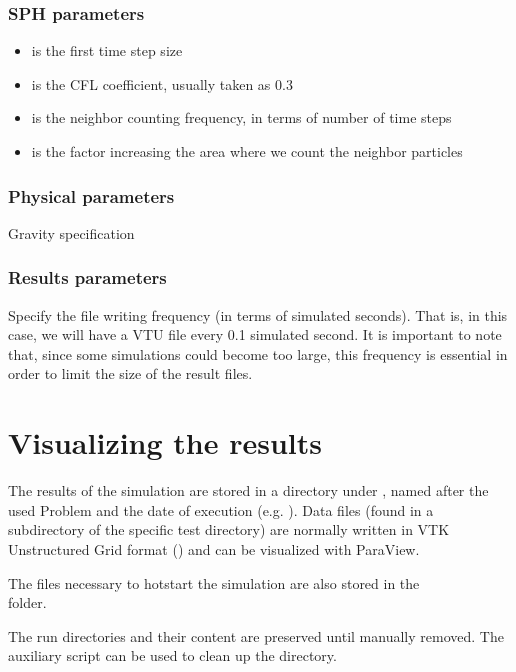 \documentclass[12pt]{memoir}
\begin{document}
\subsubsection{SPH parameters}

\begin{itemize}
\item {} is the first time step size
\item {} is the CFL coefficient, usually taken as 0.3
\item {} is the neighbor counting frequency, in terms of number of time steps
\item {} is the factor increasing the area where we count the neighbor particles
\end{itemize}

\subsubsection{Physical parameters}
Gravity specification

\subsubsection{Results parameters}

Specify the file writing frequency (in terms of simulated seconds). 
That is, in this case, we will have a VTU file every 0.1 simulated second. 
It is important to note that, since some simulations could become 
too large, this frequency is essential in order to limit the size of the result files.


\section{Visualizing the results}

The results of the simulation are stored in a directory under
, named after the used Problem and the date of execution
(e.g. ). Data files (found in a
 subdirectory of the specific test directory) are normally
written in VTK Unstructured Grid format () and can be
visualized with ParaView.

The files necessary to hotstart the simulation are also stored
in the \\  folder.

The run directories and their content are preserved until manually
removed. The  auxiliary script can be used to clean
up the  directory.
\end{document}

